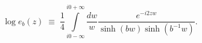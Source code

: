 \begin{equation}
\log e_b(z)\;\equiv\;\frac{1}{4}
\int\limits_{i0-\infty}^{i0+\infty}\frac{dw}{w}
\frac{e^{-i 2 zw}}{\sinh(bw)
\sinh(b^{-1}w)}.
\end{equation}

